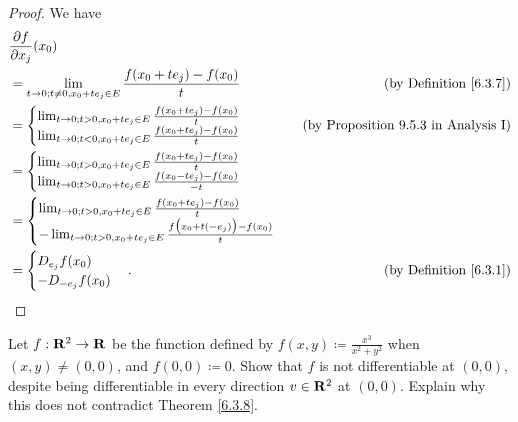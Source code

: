 \begin{proof}
    We have
    \begin{align*}
         & \frac{\partial f}{\partial x_j}(x_0)                                                                                         \\
         & = \lim_{t \to 0 ; t \neq 0, x_0 + t e_j \in E} \frac{f(x_0 + t e_j) - f(x_0)}{t}        & \text{(by Definition \ref{6.3.7})} \\
         & = \begin{cases}
                 \lim_{t \to 0 ; t > 0, x_0 + t e_j \in E} \frac{f(x_0 + t e_j) - f(x_0)}{t} \\
                 \lim_{t \to 0 ; t < 0, x_0 + t e_j \in E} \frac{f(x_0 + t e_j) - f(x_0)}{t}
             \end{cases}          & \text{(by Proposition 9.5.3 in Analysis I)}                                                \\
         & = \begin{cases}
                 \lim_{t \to 0 ; t > 0, x_0 + t e_j \in E} \frac{f(x_0 + t e_j) - f(x_0)}{t} \\
                 \lim_{t \to 0 ; t > 0, x_0 + t e_j \in E} \frac{f(x_0 - t e_j) - f(x_0)}{-t}
             \end{cases}                                                \\
         & = \begin{cases}
                 \lim_{t \to 0 ; t > 0, x_0 + t e_j \in E} \frac{f(x_0 + t e_j) - f(x_0)}{t} \\
                 -\lim_{t \to 0 ; t > 0, x_0 + t e_j \in E} \frac{f\big(x_0 + t (-e_j)\big) - f(x_0)}{t}
             \end{cases}                                     \\
         & = \begin{cases}
                 D_{e_j} f(x_0) \\
                 - D_{-e_j} f(x_0)
             \end{cases}.                                                                       & \text{(by Definition \ref{6.3.1})}
    \end{align*}
\end{proof}

\begin{exercise}\label{ex 6.3.3}
    Let \(f : \mathbf{R}^2 \to \mathbf{R}\) be the function defined by \(f(x, y) \coloneqq \frac{x^3}{x^2 + y^2}\) when \((x, y) \neq (0, 0)\), and \(f(0, 0) \coloneqq 0\).
    Show that \(f\) is not differentiable at \((0, 0)\), despite being differentiable in every direction \(v \in \mathbf{R}^2\) at \((0, 0)\).
    Explain why this does not contradict Theorem \ref{6.3.8}.
\end{exercise}

